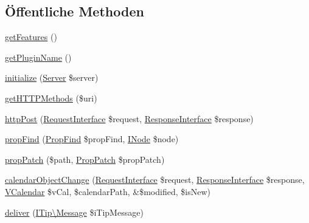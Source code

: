 \subsection*{Öffentliche Methoden}
\begin{DoxyCompactItemize}
\item 
\mbox{\hyperlink{class_sabre_1_1_cal_d_a_v_1_1_schedule_1_1_plugin_ae2910ae149a600936eea6635490595db}{get\+Features}} ()
\item 
\mbox{\hyperlink{class_sabre_1_1_cal_d_a_v_1_1_schedule_1_1_plugin_a2b408ffca42fade002db71d49b8d23d1}{get\+Plugin\+Name}} ()
\item 
\mbox{\hyperlink{class_sabre_1_1_cal_d_a_v_1_1_schedule_1_1_plugin_a0b54fbec976fd489a80e4fc6dd60e037}{initialize}} (\mbox{\hyperlink{class_sabre_1_1_d_a_v_1_1_server}{Server}} \$server)
\item 
\mbox{\hyperlink{class_sabre_1_1_cal_d_a_v_1_1_schedule_1_1_plugin_aea87c4958706c7ec3d0d9f6704c370c9}{get\+H\+T\+T\+P\+Methods}} (\$uri)
\item 
\mbox{\hyperlink{class_sabre_1_1_cal_d_a_v_1_1_schedule_1_1_plugin_a6db2c9e9c853170d758160a80fd491df}{http\+Post}} (\mbox{\hyperlink{interface_sabre_1_1_h_t_t_p_1_1_request_interface}{Request\+Interface}} \$request, \mbox{\hyperlink{interface_sabre_1_1_h_t_t_p_1_1_response_interface}{Response\+Interface}} \$response)
\item 
\mbox{\hyperlink{class_sabre_1_1_cal_d_a_v_1_1_schedule_1_1_plugin_ac7b9c55a435e5a4434524938bf1e84fd}{prop\+Find}} (\mbox{\hyperlink{class_sabre_1_1_d_a_v_1_1_prop_find}{Prop\+Find}} \$prop\+Find, \mbox{\hyperlink{interface_sabre_1_1_d_a_v_1_1_i_node}{I\+Node}} \$node)
\item 
\mbox{\hyperlink{class_sabre_1_1_cal_d_a_v_1_1_schedule_1_1_plugin_a7fe624813d90d3998a6a2fec6600a1d1}{prop\+Patch}} (\$path, \mbox{\hyperlink{class_sabre_1_1_d_a_v_1_1_prop_patch}{Prop\+Patch}} \$prop\+Patch)
\item 
\mbox{\hyperlink{class_sabre_1_1_cal_d_a_v_1_1_schedule_1_1_plugin_a546feae19f0822e0f924db4c85a68e78}{calendar\+Object\+Change}} (\mbox{\hyperlink{interface_sabre_1_1_h_t_t_p_1_1_request_interface}{Request\+Interface}} \$request, \mbox{\hyperlink{interface_sabre_1_1_h_t_t_p_1_1_response_interface}{Response\+Interface}} \$response, \mbox{\hyperlink{class_sabre_1_1_v_object_1_1_component_1_1_v_calendar}{V\+Calendar}} \$v\+Cal, \$calendar\+Path, \&\$modified, \$is\+New)
\item 
\mbox{\hyperlink{class_sabre_1_1_cal_d_a_v_1_1_schedule_1_1_plugin_a2724a6d004b35efcdb07b38cc92eb6c8}{deliver}} (\mbox{\hyperlink{class_sabre_1_1_v_object_1_1_i_tip_1_1_message}{I\+Tip\textbackslash{}\+Message}} \$i\+Tip\+Message)

\end{DoxyCompactItemize}
